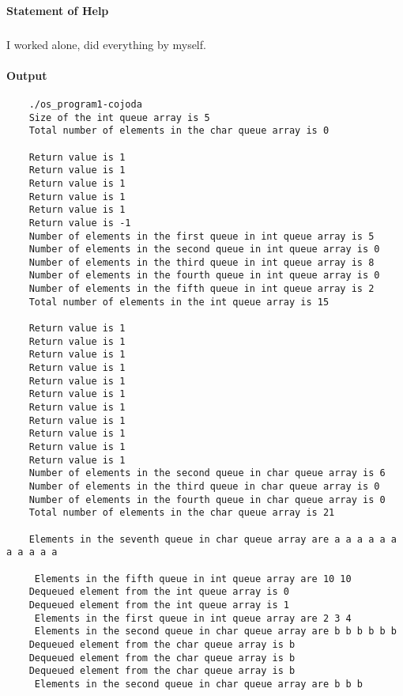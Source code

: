 \paragraph*{Statement of Help}
\subparagraph*{}
I worked alone, did everything by myself.

\paragraph*{Output}
\indent \fontsize{10}{9.7}\selectfont \begin{verbatim}
    ./os_program1-cojoda
    Size of the int queue array is 5
    Total number of elements in the char queue array is 0
    
    Return value is 1
    Return value is 1
    Return value is 1
    Return value is 1
    Return value is 1
    Return value is -1
    Number of elements in the first queue in int queue array is 5
    Number of elements in the second queue in int queue array is 0
    Number of elements in the third queue in int queue array is 8
    Number of elements in the fourth queue in int queue array is 0
    Number of elements in the fifth queue in int queue array is 2
    Total number of elements in the int queue array is 15
    
    Return value is 1
    Return value is 1
    Return value is 1
    Return value is 1
    Return value is 1
    Return value is 1
    Return value is 1
    Return value is 1
    Return value is 1
    Return value is 1
    Return value is 1
    Number of elements in the second queue in char queue array is 6
    Number of elements in the third queue in char queue array is 0
    Number of elements in the fourth queue in char queue array is 0
    Total number of elements in the char queue array is 21
    
    Elements in the seventh queue in char queue array are a a a a a a a a a a a
    
     Elements in the fifth queue in int queue array are 10 10
    Dequeued element from the int queue array is 0
    Dequeued element from the int queue array is 1
     Elements in the first queue in int queue array are 2 3 4
     Elements in the second queue in char queue array are b b b b b b
    Dequeued element from the char queue array is b
    Dequeued element from the char queue array is b
    Dequeued element from the char queue array is b
     Elements in the second queue in char queue array are b b b
    
    \end{verbatim}